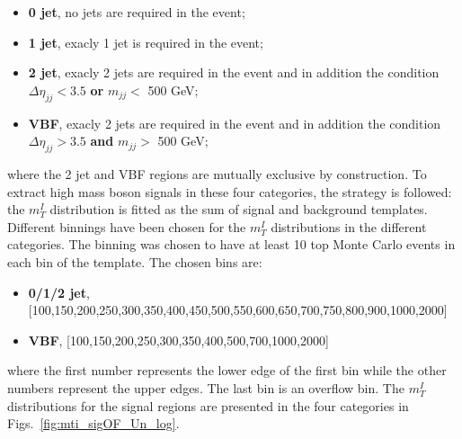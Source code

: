 \begin{itemize}
\item {\bf 0 jet}, no jets are required in the event;
\item {\bf 1 jet}, exacly 1 jet is required in the event;
\item {\bf 2 jet}, exacly 2 jets are required in the event and in addition the condition $\Delta \eta_{jj} < 3.5$ {\bf or} $m_{jj} <$ 500 GeV;
\item {\bf VBF}, exacly 2 jets are required in the event and in addition the condition $\Delta \eta_{jj} > 3.5$ {\bf and} $m_{jj} >$ 500 GeV;
\end{itemize}
where the 2 jet and VBF regions are mutually exclusive by construction.
To extract high mass boson signals in these four categories, the  strategy  is followed: the $m_T^I$ distribution is fitted as the sum of
signal and background templates. Different binnings have been chosen for the  $m_T^I$ distributions in the
different categories. The binning was chosen to have  at least 10
top Monte Carlo events in each bin of the template. The chosen bins are: 
\begin{itemize}
\item  {\bf 0/1/2 jet}, [100,150,200,250,300,350,400,450,500,550,600,650,700,750,800,900,1000,2000]
\item {\bf VBF}, [100,150,200,250,300,350,400,500,700,1000,2000]
\end{itemize}
where the first number represents the lower edge of the first bin while the other numbers represent the upper edges. The last bin is an overflow bin.
The  $m_T^I$ distributions for the signal regions are presented in the four categories in Figs.~\ref{fig:mti_sigOF_Un_log}.

